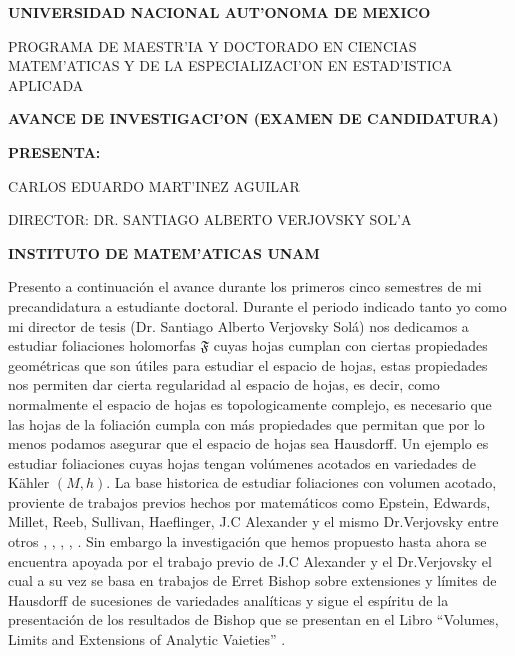\documentclass[letterpaper]{report}
\begin{document}
\begin{titlepage}
\begin{center}

\LARGE\textbf{ UNIVERSIDAD NACIONAL AUT'ONOMA DE MEXICO}
\vspace*{0.3cm}

\large PROGRAMA DE MAESTR'IA Y DOCTORADO EN CIENCIAS MATEM'ATICAS Y DE LA ESPECIALIZACI'ON EN ESTAD'ISTICA APLICADA
\vspace*{2cm}

\LARGE\textbf{AVANCE DE INVESTIGACI'ON (EXAMEN DE CANDIDATURA)}
\vspace*{2cm}

\small\textbf{PRESENTA:}
\vspace*{0.2cm}

\small CARLOS EDUARDO MART'INEZ AGUILAR
\vspace*{0.2cm}

\small DIRECTOR: DR. SANTIAGO ALBERTO VERJOVSKY SOL'A
\vspace*{0.2cm}

\small \textbf{INSTITUTO DE MATEM'ATICAS UNAM}
\vspace*{2.5cm}

\end{center}
\end{titlepage}
\noindent Presento a continuaci\'on el avance durante los primeros cinco semestres de mi precandidatura a estudiante doctoral.
Durante el periodo indicado tanto yo como mi director de tesis (Dr. Santiago Alberto Verjovsky Sol\'a) nos dedicamos a estudiar 
foliaciones holomorfas $\mathfrak{F}$ cuyas hojas cumplan con ciertas propiedades geom\'etricas que son \'utiles para estudiar el espacio de hojas,
estas propiedades nos permiten dar cierta regularidad al espacio de hojas, es decir, como normalmente el espacio de hojas es 
topologicamente complejo, es necesario que las hojas de la foliaci\'on cumpla con m\'as propiedades que permitan que por lo menos
podamos asegurar que el espacio de hojas sea Hausdorff. Un ejemplo es estudiar foliaciones cuyas hojas tengan vol\'umenes acotados 
en variedades de K\"ahler $(M,h)$. La base historica de estudiar foliaciones con volumen acotado, proviente de trabajos previos hechos por matem\'aticos como
Epstein, Edwards, Millet, Reeb, Sullivan, Haeflinger, J.C Alexander y el mismo Dr.Verjovsky entre otros \cite{Epstein1}, \cite{Epstein2}, \cite{EMS}, \cite{E-V}, \cite{V-A}. 
Sin embargo la investigaci\'on que hemos propuesto hasta ahora se encuentra apoyada por el trabajo previo de J.C Alexander y el 
Dr.Verjovsky \cite{V-A} el cual a su vez se basa en trabajos de Erret Bishop \cite{Bishop} sobre extensiones y l\'imites de Hausdorff 
de sucesiones de variedades anal\'iticas y sigue el esp\'iritu de la presentaci\'on de los resultados de Bishop que se presentan en el 
Libro ``Volumes, Limits and Extensions of Analytic Vaieties'' \cite{Stolzenberg}.
\end{document}
